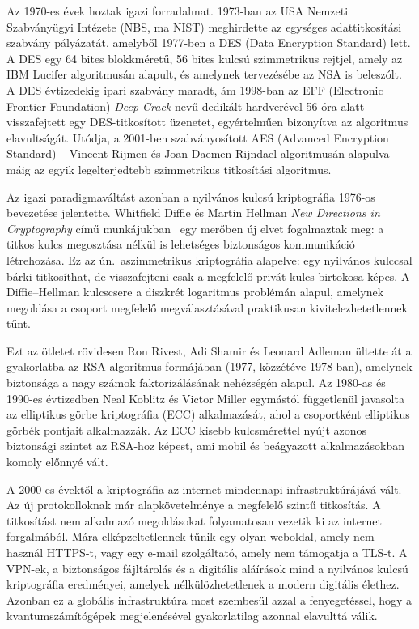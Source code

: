 Az 1970-es évek hoztak igazi forradalmat. 1973-ban az USA Nemzeti Szabványügyi Intézete (NBS, ma
NIST) meghirdette az egységes adattitkosítási szabvány pályázatát, amelyből 1977-ben a DES (Data
Encryption Standard) lett. A DES egy 64 bites blokkméretű, 56 bites kulcsú szimmetrikus rejtjel,
amely az IBM Lucifer algoritmusán alapult, és amelynek tervezésébe az NSA is beleszólt. A DES
évtizedekig ipari szabvány maradt, ám 1998-ban az EFF (Electronic Frontier Foundation) \textit{Deep
Crack} nevű dedikált hardverével 56 óra alatt visszafejtett egy DES-titkosított üzenetet,
egyértelműen bizonyítva az algoritmus elavultságát. Utódja, a 2001-ben szabványosított AES (Advanced
Encryption Standard) -- Vincent Rijmen és Joan Daemen Rijndael algoritmusán alapulva -- máig az
egyik legelterjedtebb szimmetrikus titkosítási algoritmus.

Az igazi paradigmaváltást azonban a nyilvános kulcsú kriptográfia 1976-os bevezetése jelentette.
Whitfield Diffie és Martin Hellman \textit{New Directions in Cryptography} című munkájukban~\cite{diffie1976}
egy merőben új elvet fogalmaztak meg: a titkos kulcs megosztása nélkül is lehetséges biztonságos
kommunikáció létrehozása. Ez az ún.\ aszimmetrikus kriptográfia alapelve: egy nyilvános kulccsal
bárki titkosíthat, de visszafejteni csak a megfelelő privát kulcs birtokosa képes. A Diffie--Hellman
kulcscsere a diszkrét logaritmus problémán alapul, amelynek megoldása a csoport megfelelő
megválasztásával praktikusan kivitelezhetetlennek tűnt.

Ezt az ötletet rövidesen Ron Rivest, Adi Shamir és Leonard Adleman ültette át a gyakorlatba az RSA
algoritmus formájában (1977, közzétéve 1978-ban), amelynek biztonsága a nagy számok faktorizálásának
nehézségén alapul. Az 1980-as és 1990-es évtizedben Neal Koblitz és Victor Miller egymástól
függetlenül javasolta az elliptikus görbe kriptográfia (ECC) alkalmazását, ahol a csoportként
elliptikus görbék pontjait alkalmazzák. Az ECC kisebb kulcsmérettel nyújt azonos biztonsági szintet
az RSA-hoz képest, ami mobil és beágyazott alkalmazásokban komoly előnnyé vált.

A 2000-es évektől a kriptográfia az internet mindennapi infrastruktúrájává vált. Az új protokolloknak már alapkövetelménye a megfelelő szintű titkosítás. A titkosítást nem alkalmazó megoldásokat folyamatosan vezetik ki az internet forgalmából. Mára elképzeltetlennek tűnik egy olyan weboldal, amely nem használ HTTPS-t, vagy egy e-mail szolgáltató, amely nem támogatja a TLS-t. A VPN-ek, a biztonságos fájltárolás és a digitális aláírások mind a nyilvános kulcsú kriptográfia eredményei, amelyek nélkülözhetetlenek a modern digitális élethez. Azonban ez a globális infrastruktúra most szembesül azzal a fenyegetéssel, hogy a kvantumszámítógépek megjelenésével gyakorlatilag azonnal elavulttá válik.


